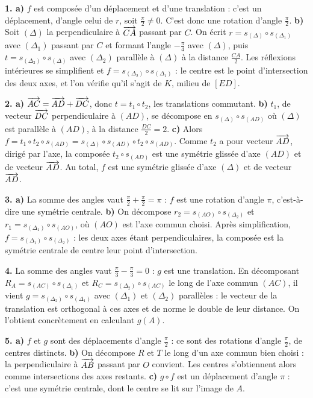\begin{corrige}[annales]
\textbf{1. a)} $f$ est composée d'un déplacement et d'une translation : c'est
un déplacement, d'angle celui de $r$, soit $\frac{\pi}{2} \neq 0$. C'est donc
une rotation d'angle $\frac{\pi}{2}$.
\textbf{b)} Soit $(\Delta)$ la perpendiculaire à $\overrightarrow{CA}$ passant par $C$.
On écrit $r = s_{(\Delta)} \circ s_{(\Delta_{1})}$ avec $(\Delta_{1})$ passant
par $C$ et formant l'angle $-\frac{\pi}{4}$ avec $(\Delta)$, puis
$t = s_{(\Delta_{2})} \circ s_{(\Delta)}$ avec $(\Delta_{2})$ parallèle à
$(\Delta)$ à la distance $\frac{CA}{2}$. Les réflexions intérieures se
simplifient et $f = s_{(\Delta_{2})} \circ s_{(\Delta_{1})}$ : le centre est
le point d'intersection des deux axes, et l'on vérifie qu'il s'agit de $K$,
milieu de $[ED]$.

\textbf{2. a)} $\overrightarrow{AC} = \overrightarrow{AD}+\overrightarrow{DC}$, donc
$t = t_{1} \circ t_{2}$, les translations commutant.
\textbf{b)} $t_{1}$, de vecteur $\overrightarrow{DC}$ perpendiculaire à $(AD)$, se
décompose en $s_{(\Delta)} \circ s_{(AD)}$ où $(\Delta)$ est parallèle à
$(AD)$, à la distance $\frac{DC}{2} = 2$.
\textbf{c)} Alors
$f = t_{1} \circ t_{2} \circ s_{(AD)}
= s_{(\Delta)} \circ s_{(AD)} \circ t_{2} \circ s_{(AD)}$. Comme $t_{2}$ a
pour vecteur $\overrightarrow{AD}$, dirigé par l'axe, la composée
$t_{2} \circ s_{(AD)}$ est une symétrie glissée d'axe $(AD)$ et de vecteur
$\overrightarrow{AD}$. Au total, $f$ est une symétrie glissée d'axe $(\Delta)$ et de
vecteur $\overrightarrow{AD}$.

\textbf{3. a)} La somme des angles vaut $\frac{\pi}{2}+\frac{\pi}{2} = \pi$ :
$f$ est une rotation d'angle $\pi$, c'est-à-dire une symétrie centrale.
\textbf{b)} On décompose $r_{2} = s_{(AO)} \circ s_{(\Delta_{2})}$ et
$r_{1} = s_{(\Delta_{1})} \circ s_{(AO)}$, où $(AO)$ est l'axe commun choisi.
Après simplification, $f = s_{(\Delta_{1})} \circ s_{(\Delta_{2})}$ : les deux
axes étant perpendiculaires, la composée est la symétrie centrale de centre
leur point d'intersection.

\textbf{4.} La somme des angles vaut $\frac{\pi}{3}-\frac{\pi}{3} = 0$ : $g$
est une translation. En décomposant $R_{A} = s_{(AC)} \circ s_{(\Delta_{1})}$
et $R_{C} = s_{(\Delta_{2})} \circ s_{(AC)}$ le long de l'axe commun $(AC)$,
il vient $g = s_{(\Delta_{2})} \circ s_{(\Delta_{1})}$ avec
$(\Delta_{1})$ et $(\Delta_{2})$ parallèles : le vecteur de la translation est
orthogonal à ces axes et de norme le double de leur distance. On l'obtient
concrètement en calculant $g(A)$.

\textbf{5. a)} $f$ et $g$ sont des déplacements d'angle $\frac{\pi}{2}$ : ce
sont des rotations d'angle $\frac{\pi}{2}$, de centres distincts.
\textbf{b)} On décompose $R$ et $T$ le long d'un axe commun bien choisi : la
perpendiculaire à $\overrightarrow{AB}$ passant par $O$ convient. Les centres
s'obtiennent alors comme intersections des axes restants.
\textbf{c)} $g \circ f$ est un déplacement d'angle $\pi$ : c'est une symétrie
centrale, dont le centre se lit sur l'image de $A$.


\end{corrige}
